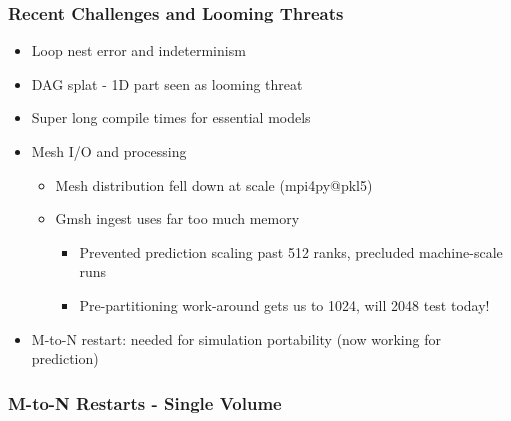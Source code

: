 \begin{frame}\frametitle{Recent Challenges and Looming Threats}
\begin{itemize}
\item Loop nest error and indeterminism 
\item DAG splat - 1D part seen as looming threat
\item Super long compile times for essential models
\item Mesh I/O and processing
\begin{itemize}
\item Mesh distribution fell down at scale (mpi4py@pkl5)
\item Gmsh ingest uses far too much memory
\begin{itemize}
\item Prevented prediction scaling past 512 ranks, precluded machine-scale runs
\item Pre-partitioning work-around gets us to 1024, will 2048 test today!
\end{itemize}
\end{itemize}
\item M-to-N restart: needed for simulation portability (now working for prediction)
\end{itemize}
\end{frame}


\begin{frame}\frametitle{M-to-N Restarts - Single Volume}
\end{frame}

